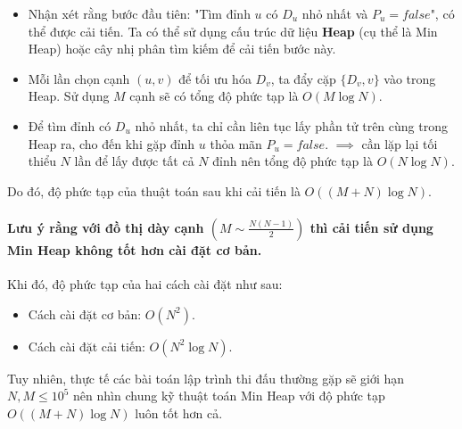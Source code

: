 \documentclass{article}
\begin{document}
\begin{itemize}
    \item Nhận xét rằng bước đầu tiên: "Tìm đỉnh $u$ có $D_u$ nhỏ nhất và $P_u = false$", có thể được cải tiến. Ta có thể sử dụng cấu trúc dữ liệu \textbf{Heap} (cụ thể là Min Heap) hoặc cây nhị phân tìm kiếm để cải tiến bước này.
    \item Mỗi lần chọn cạnh $(u, v)$ để tối ưu hóa $D_v$, ta đẩy cặp $\{D_v, v\}$ vào trong Heap. Sử dụng $M$ cạnh sẽ có tổng độ phức tạp là $O(M \log N)$.
    \item Để tìm đỉnh có $D_u$ nhỏ nhất, ta chỉ cần liên tục lấy phần tử trên cùng trong Heap ra, cho đến khi gặp đỉnh $u$ thỏa mãn $P_u = false$. $\implies$ cần lặp lại tối thiểu $N$ lần để lấy được tất cả $N$ đỉnh nên tổng độ phức tạp là $O(N \log N)$.
\end{itemize}

\noindent
Do đó, độ phức tạp của thuật toán sau khi cải tiến là $O((M + N)\log N)$.

\paragraph{Lưu ý rằng với đồ thị dày cạnh $\left(M \sim \frac{N(N-1)}{2}\right)$ thì cải tiến sử dụng Min Heap không tốt hơn cài đặt cơ bản.} Khi đó, độ phức tạp của hai cách cài đặt như sau:
\begin{itemize}
    \item Cách cài đặt cơ bản: $O(N^2)$.
    \item Cách cài đặt cải tiến: $O(N^2 \log N)$.
\end{itemize}

Tuy nhiên, thực tế các bài toán lập trình thi đấu thường gặp sẽ giới hạn $N, M \leq 10^5$ nên nhìn chung kỹ thuật toán Min Heap với độ phức tạp $O((M + N)\log N)$ luôn tốt hơn cả.
\end{document}
